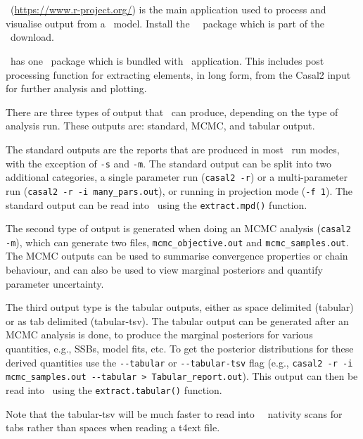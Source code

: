 \section{ \label{sec:PostProcessing}}

\R\ (\url{https://www.r-project.org/}) is the main application used to process and visualise output from a \CNAME\ model. Install the \cname\ \R\ package which is part of the \CNAME\ download.

\CNAME\ has one \R\ package which is bundled with \CNAME\ application. This includes post processing function for extracting elements, in long form, from the Casal2 input for further analysis and plotting.  

There are three types of output that \CNAME\ can produce, depending on the type of analysis run. These outputs are: standard, MCMC, and tabular output.

The standard outputs are the reports that are produced in most \CNAME\ run modes, with the exception of \texttt{-s} and \texttt{-m}. The standard output can be split into two additional categories, a single parameter run (\texttt{casal2 -r}) or a multi-parameter run (\texttt{casal2 -r -i many\_pars.out}), or running in projection mode (\texttt{-f 1}). The standard output can be read into \R\ using the \texttt{extract.mpd()} function.

The second type of output is generated when doing an MCMC analysis (\texttt{casal2 -m}), which can generate two files, \texttt{mcmc\_objective.out} and \texttt{mcmc\_samples.out}. The MCMC outputs can be used to summarise convergence properties or chain behaviour, and can also be used to view marginal posteriors and quantify parameter uncertainty.

The third output type is the tabular outputs, either as space delimited (tabular) or as tab delimited (tabular-tsv). The tabular output can be generated after an MCMC analysis is done, to produce the marginal posteriors for various quantities, e.g., SSBs, model fits, etc. To get the posterior distributions for these derived quantities use the \texttt{-{}-tabular} or  \texttt{-{}-tabular-tsv} flag (e.g., \texttt{casal2 -r -i mcmc\_samples.out -{}-tabular > Tabular\_report.out}). This output can then be read into \R\ using the \texttt{extract.tabular()} function.

Note that the tabular-tsv will be much faster to read into \R\, \R\ nativity scans for tabs rather than spaces when reading a t4ext file.

